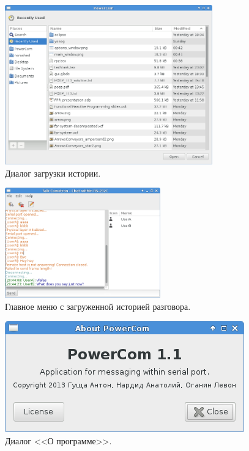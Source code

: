\documentclass[russian,utf8,simple,emptystyle]{eskdtext}
\begin{document}
\begin{figure}[!h]
\centering
\includegraphics[width=0.8\textwidth]{history_load}
\caption{Диалог загрузки истории.}
\label{fig:history-load}
\end{figure}

\begin{figure}[!h]
\centering
\includegraphics[width=0.6\textwidth]{history_view}
\caption{Главное меню с загруженной историей разговора.}
\label{fig:history-view}
\end{figure}

\begin{figure}[!h]
\centering
\includegraphics[scale=0.7]{about_dialog}
\caption{Диалог <<О программе>>.}
\label{fig:about-dialog}
\end{figure}
\end{document}
